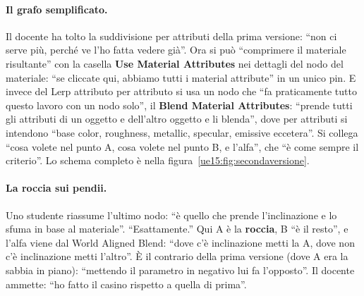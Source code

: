 \paragraph{Il grafo semplificato.} Il docente ha tolto la suddivisione per attributi della
prima versione: ``non ci serve più, perché ve l'ho fatta vedere già''. Ora si può
``comprimere il materiale risultante'' con la casella \textbf{Use Material Attributes} nei
dettagli del nodo del materiale: ``se cliccate qui, abbiamo tutti i material attribute'' in
un unico pin. E invece del Lerp attributo per attributo si usa un nodo che ``fa praticamente
tutto questo lavoro con un nodo solo'', il \textbf{Blend Material Attributes}: ``prende
tutti gli attributi di un oggetto e dell'altro oggetto e li blenda'', dove per attributi si
intendono ``base color, roughness, metallic, specular, emissive eccetera''. Si collega
``cosa volete nel punto A, cosa volete nel punto B, e l'alfa'', che ``è come sempre il
criterio''. Lo schema completo è nella figura~\ref{ue15:fig:secondaversione}.

\paragraph{La roccia sui pendii.} Uno studente riassume l'ultimo nodo: ``è quello che prende
l'inclinazione e lo sfuma in base al materiale''. ``Esattamente.'' Qui A è la
\textbf{roccia}, B ``è il resto'', e l'alfa viene dal World Aligned Blend: ``dove c'è
inclinazione metti la A, dove non c'è inclinazione metti l'altro''. È il contrario della
prima versione (dove A era la sabbia in piano): ``mettendo il parametro in negativo lui fa
l'opposto''. Il docente ammette: ``ho fatto il casino rispetto a quella di prima''.

